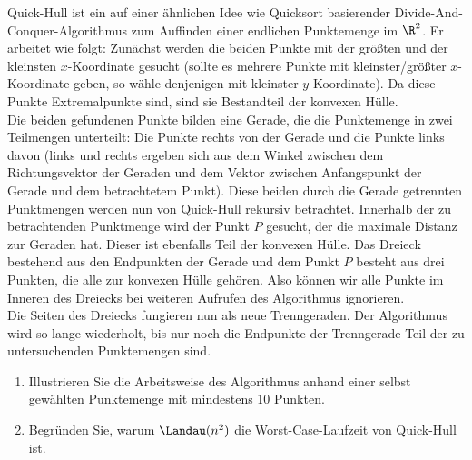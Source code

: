 
\begin{exercise}

Quick-Hull ist ein auf einer ähnlichen Idee wie Quicksort basierender
Divide-And-Conquer-Algorithmus zum Auffinden einer endlichen Punktemenge im $\R^2$.
Er arbeitet wie folgt: Zunächst werden die beiden Punkte mit der größten und der
kleinsten $x$-Koordinate gesucht (sollte es mehrere Punkte mit kleinster/größter
$x$-Koordinate geben, so wähle denjenigen mit kleinster $y$-Koordinate).
Da diese Punkte Extremalpunkte sind, sind sie Bestandteil der konvexen Hülle. \\
Die beiden gefundenen Punkte bilden eine Gerade, die die Punktemenge in zwei
Teilmengen unterteilt: Die Punkte rechts von der Gerade und die Punkte links davon
(links und rechts ergeben sich aus dem Winkel zwischen dem Richtungsvektor der Geraden
und dem Vektor zwischen Anfangspunkt der Gerade und dem betrachtetem Punkt).
Diese beiden durch die Gerade getrennten Punktmengen werden nun von Quick-Hull
rekursiv betrachtet. Innerhalb der zu betrachtenden Punktmenge wird der Punkt $P$
gesucht, der die maximale Distanz zur Geraden hat. Dieser ist ebenfalls Teil der
konvexen Hülle. Das Dreieck bestehend aus den Endpunkten der Gerade und dem Punkt $P$
besteht aus drei Punkten, die alle zur konvexen Hülle gehören. Also können wir
alle Punkte im Inneren des Dreiecks bei weiteren Aufrufen des Algorithmus ignorieren. \\
Die Seiten des Dreiecks fungieren nun als neue Trenngeraden. Der Algorithmus
wird so lange wiederholt, bis nur noch die Endpunkte der Trenngerade Teil der
zu untersuchenden Punktemengen sind.

\begin{enumerate}[label = \alph*)]
  \item Illustrieren Sie die Arbeitsweise des Algorithmus anhand einer selbst
  gewählten Punktemenge mit mindestens 10 Punkten.
  \item Begründen Sie, warum $\Landau(n^2)$ die Worst-Case-Laufzeit von Quick-Hull ist.
\end{enumerate}

\end{exercise}



